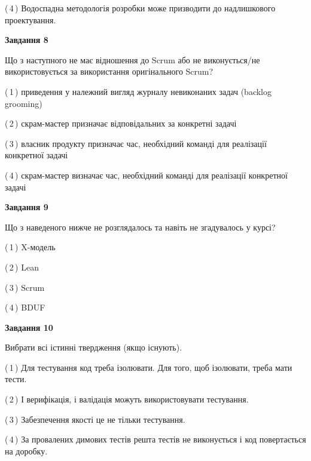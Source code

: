 \documentclass[10pt, ukrainian]{article}
\begin{document}
{\begin {large}
(\,4\,) Водоспадна методологія розробки може призводити до надлишкового проектування. %


{\begin {center}\textbf{Завдання 8}\end {center}}\par
Що з наступного не має відношення до Scrum або не виконується/не використовується за використання оригінального Scrum?\par
\vspace{2mm}



(\,1\,) приведення у належний вигляд журналу невиконаних задач (backlog grooming) %



(\,2\,) скрам-мастер призначає відповідальних за конкретні задачі%



(\,3\,) власник продукту призначає час, необхідний команді для реалізації конкретної задачі%



(\,4\,) скрам-мастер визначає час, необхідний команді для реалізації конкретної задачі%


{\begin {center}\textbf{Завдання 9}\end {center}}\par
Що з наведеного нижче не розглядалось та навіть не згадувалось у курсі?\par
\vspace{2mm}



(\,1\,) X-модель%



(\,2\,) Lean%



(\,3\,) Scrum%



(\,4\,) BDUF%


{\begin {center}\textbf{Завдання 10}\end {center}}\par
Вибрати всі істинні твердження (якщо існують).\par
\vspace{2mm}



(\,1\,) Для тестування код треба ізолювати. Для того, щоб ізолювати, треба мати тести.%



(\,2\,) І верифікація, і валідація можуть використовувати тестування.%



(\,3\,) Забезпечення якості це не тільки тестування.%



(\,4\,) За провалених димових тестів решта тестів не виконується і код повертається на доробку.%



\end {large}}
\end{document}
